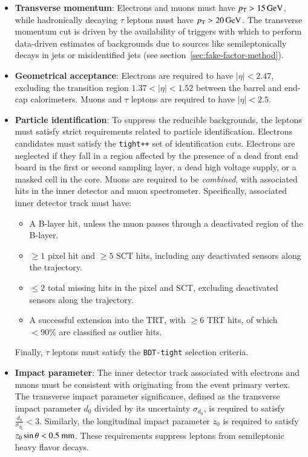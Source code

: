 \begin{itemize}

	\item \textbf{Transverse momentum}: Electrons and muons must have $p_{\text{T}}>\SI{15}{\giga\electronvolt}$, while hadronically decaying $\tau$ leptons must have $p_{\text{T}}>\SI{20}{\giga\electronvolt}$. The transverse momentum cut is driven by the availability of triggers with which to perform data-driven estimates of backgrounds due to sources like semileptonically decays in jets or misidentified jets (see section~\ref{sec:fake-factor-method}). 

	\item \textbf{Geometrical acceptance}: Electrons are required to have $|\eta|<2.47$, excluding the transition region $1.37<|\eta|<1.52$ between the barrel and end-cap calorimeters. Muons and $\tau$ leptons are required to have $|\eta|<2.5$.

	\item \textbf{Particle identification}: To suppress the reducible backgrounds, the leptons must satisfy strict requirements related to particle identification. Electrons candidates must satisfy the \texttt{tight++} set of identification cuts. Electrons are neglected if they fall in a region affected by the presence of a dead front end board in the first or second sampling layer, a dead high voltage supply, or a masked cell in the core. Muons are required to be \emph{combined}, with associated hits in the inner detector and muon spectrometer. Specifically, associated inner detector track must have:
	\begin{itemize}
	  \item A B-layer hit, unless the muon passes through a deactivated region of the B-layer.
	  \item $\geq1$ pixel hit and $\geq5$ SCT hits, including any deactivated sensors along the trajectory.
	  \item $\leq2$ total missing hits in the pixel and SCT, excluding deactivated sensors along the trajectory. 
	  \item A successful extension into the TRT, with $\geq6$ TRT hits, of which $<90\%$ are classified as outlier hits.
	\end{itemize}

	Finally, $\tau$ leptons must satisfy the \texttt{BDT-tight} selection criteria.

	\item \textbf{Impact parameter}: The inner detector track associated with electrons and muons must be consistent with originating from the event primary vertex. The transverse impact parameter significance, defined as the transverse impact parameter $d_0$ divided by its uncertainty $\sigma_{d_0}$, is required to satisfy $\frac{d_0}{\sigma_{d_0}}<3$. Similarly, the longitudinal impact parameter $z_0$ is required to satisfy $z_0\sin\theta < 0.5~\mathrm{mm}$. These requirements suppress leptons from semileptonic heavy flavor decays. 


\end{itemize}
